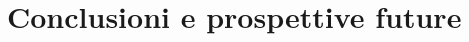\documentclass[11pt]{report}
\begin{document}
    

% 









\chapter{Conclusioni e prospettive future}
\end{document}

